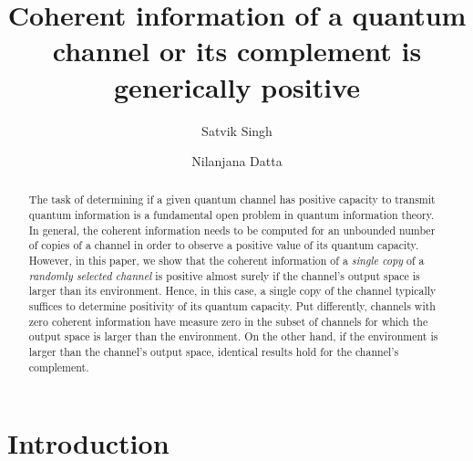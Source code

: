\documentclass[a4paper,onecolumn,10pt,accepted=2022-07-11]{quantumarticle}
\let\ACMmaketitle=\maketitle
\renewcommand{\maketitle}{\begingroup\let\footnote=\thanks \ACMmaketitle\endgroup}
\theoremstyle{definition}
\begin{document}
\title{Coherent information of a quantum channel or its complement is generically positive}

\author{Satvik Singh}

\author{Nilanjana Datta}

\begin{abstract}
The task of determining if a given quantum channel has positive capacity to transmit quantum information is a fundamental open problem in quantum information theory. 
In general, the coherent information needs to be computed for an unbounded number of copies of a channel in order to observe a positive value of its quantum capacity. However, in this paper, we show that the coherent information of a {\em{single copy}} of a {\em{randomly selected channel}} is positive almost surely if the channel's output space is larger than its environment. Hence, in this case, a single copy of the channel typically suffices to determine positivity of its quantum capacity. Put differently, channels with zero coherent information have measure zero in the subset of channels for which the output space is larger than the environment. On the other hand, if the environment is larger than the channel's output space, identical results hold for the channel's complement.





\end{abstract}

\maketitle
\tableofcontents

\section{Introduction}
\end{document}

